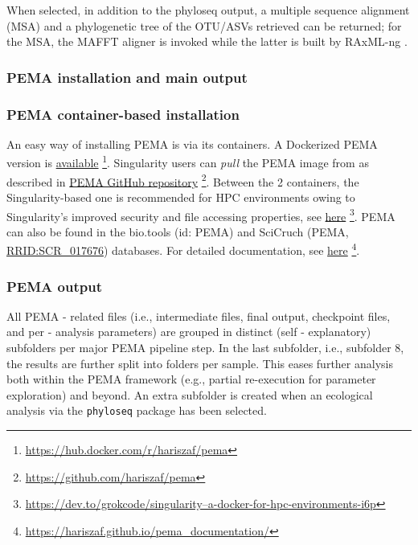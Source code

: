    When selected, in addition to the phyloseq \citep{mcmurdie2013phyloseq} output, a multiple sequence alignment (MSA) and a phylogenetic tree of the OTU/ASVs retrieved can be returned; 
   for the MSA, the MAFFT \citep{katoh2002mafft, nakamura2018parallelization} aligner is invoked while the latter is built by RAxML-ng \citep{kozlov2019raxml}.

   \subsubsection{PEMA installation and main output}
   \subsubsection*{PEMA container-based installation}

   An easy way of installing PEMA is via its containers. 
   A Dockerized PEMA version is \href{https://hub.docker.com/r/hariszaf/pema}{available} 
   \footnote{
      \href{https://hub.docker.com/r/hariszaf/pema}{https://hub.docker.com/r/hariszaf/pema}
   }. 
   Singularity users can \textit{pull} the PEMA image from as described in \href{https://github.com/hariszaf/pema}{PEMA GitHub repository}
   \footnote{
      \href{https://github.com/hariszaf/pema}{https://github.com/hariszaf/pema}
   }. 
   Between the 2 containers, the Singularity-based one is recommended for HPC environments owing to Singularity's improved security and file accessing properties, 
   see \href{https://dev.to/grokcode/singularity--a-docker-for-hpc-environments-i6p}{here}
   \footnote{
      \href{https://dev.to/grokcode/singularity--a-docker-for-hpc-environments-i6p}{https://dev.to/grokcode/singularity--a-docker-for-hpc-environments-i6p}
   }. 
   PEMA can also be found in the bio.tools (id: PEMA) and SciCruch (PEMA, \href{https://scicrunch.org/resolver/RRID:SCR_017676}{RRID:SCR\_017676}) databases. 
   For detailed documentation, 
   see \href{https://hariszaf.github.io/pema_documentation/}{here}
   \footnote{
      \href{https://hariszaf.github.io/pema_documentation/}{https://hariszaf.github.io/pema\_documentation/}
   }.

      
   \subsubsection*{PEMA output}

      All PEMA - related files (i.e., intermediate files, final output, checkpoint files, and per - analysis parameters) are grouped in distinct (self - explanatory) subfolders per major PEMA pipeline step. 
      In the last subfolder, i.e., subfolder 8, the results are further split into folders per sample. 
      This eases further analysis both within the PEMA framework (e.g., partial re-execution for parameter exploration) and beyond. 
      An extra subfolder is created when an ecological analysis via the \texttt{phyloseq} package has been selected.

